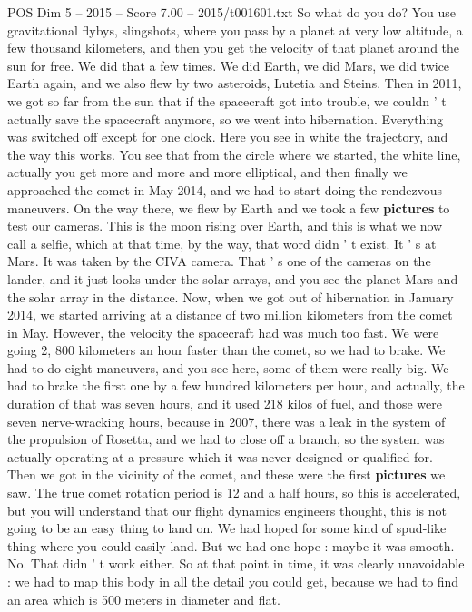 \begin{textsample}{POS Dim 5 – 2015 – Score 7.00 – 2015/t001601.txt}
So what do you do?
You use gravitational flybys, slingshots, where you pass by a planet at very low altitude, a few thousand kilometers, and then you get the velocity of that planet around the sun for free.
We did that a few times.
We did Earth, we did Mars, we did twice Earth again, and we also flew by two asteroids, Lutetia and Steins.
Then in 2011, we got so far from the sun that if the spacecraft got into trouble, we couldn ' t actually save the spacecraft anymore, so we went into hibernation.
Everything was switched off except for one clock.
Here you see in white the trajectory, and the way this works.
You see that from the circle where we started, the white line, actually you get more and more and more elliptical, and then finally we approached the comet in May 2014, and we had to start doing the rendezvous maneuvers.
On the way there, we flew by Earth and we took a few \textbf{pictures} to test our cameras.
This is the moon rising over Earth, and this is what we now call a selfie, which at that time, by the way, that word didn ' t exist.
It ' s at Mars.
It was taken by the CIVA camera.
That ' s one of the cameras on the lander, and it just looks under the solar arrays, and you see the planet Mars and the solar array in the distance.
Now, when we got out of hibernation in January 2014, we started arriving at a distance of two million kilometers from the comet in May.
However, the velocity the spacecraft had was much too fast.
We were going 2, 800 kilometers an hour faster than the comet, so we had to brake.
We had to do eight maneuvers, and you see here, some of them were really big.
We had to brake the first one by a few hundred kilometers per hour, and actually, the duration of that was seven hours, and it used 218 kilos of fuel, and those were seven nerve-wracking hours, because in 2007, there was a leak in the system of the propulsion of Rosetta, and we had to close off a branch, so the system was actually operating at a pressure which it was never designed or qualified for.
Then we got in the vicinity of the comet, and these were the first \textbf{pictures} we saw.
The true comet rotation period is 12 and a half hours, so this is accelerated, but you will understand that our flight dynamics engineers thought, this is not going to be an easy thing to land on.
We had hoped for some kind of spud-like thing where you could easily land.
But we had one hope : maybe it was smooth.
No.
That didn ' t work either.
So at that point in time, it was clearly unavoidable : we had to map this body in all the detail you could get, because we had to find an area which is 500 meters in diameter and flat.

\end{textsample}
